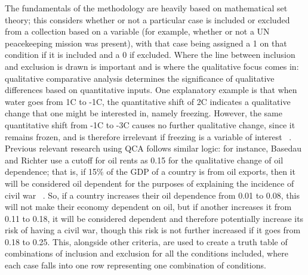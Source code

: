 \documentclass{article}
\begin{document}
The fundamentals of the methodology are heavily based on mathematical set theory; this considers whether or not a particular case is included or excluded from a collection based on a variable (for example, whether or not a UN peacekeeping mission was present), with that case being assigned a 1 on that condition if it is included and a 0 if excluded. Where the line between inclusion and exclusion is drawn is important and is where the qualitative focus comes in: qualitative comparative analysis determines the significance of qualitative differences based on quantitative inputs. One explanatory example is that when water goes from 1C to -1C, the quantitative shift of 2C indicates a qualitative change that one might be interested in, namely freezing. However, the same quantitative shift from -1C to -3C causes no further qualitative change, since it remains frozen, and is therefore irrelevant if freezing is a variable of interest ~\cite{mello}. Previous relevant research using QCA follows similar logic: for instance, Basedau and Richter use a cutoff for oil rents as 0.15 for the qualitative change of oil dependence; that is, if 15\% of the GDP of a country is from oil exports, then it will be considered oil dependent for the purposes of explaining the incidence of civil war ~\cite{basedau}. So, if a country increases their oil dependence from 0.01 to 0.08, this will not make their economy dependent on oil, but if another increases it from 0.11 to 0.18, it will be considered dependent and therefore potentially increase its risk of having a civil war, though this risk is not further increased if it goes from 0.18 to 0.25. This, alongside other criteria, are used to create a truth table of combinations of inclusion and exclusion for all the conditions included, where each case falls into one row representing one combination of conditions.
\end{document}
